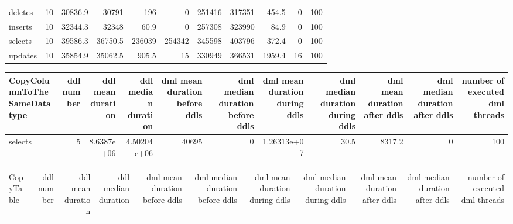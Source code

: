 \begin{tabular}{lrrrrrrrrrr}
\hline
 deletes         &           10 &             30836.9 &               30791   &                           196   &                                 0 &                          251416 &                            317351 &                          454.5 &                                0 &                              100 \\
 inserts         &           10 &             32344.3 &               32348   &                            60.9 &                                 0 &                          257308 &                            323990 &                           84.9 &                                0 &                              100 \\
 selects         &           10 &             39586.3 &               36750.5 &                        236039   &                            254342 &                          345598 &                            403796 &                          372.4 &                                0 &                              100 \\
 updates         &           10 &             35854.9 &               35062.5 &                           905.5 &                                15 &                          330949 &                            366531 &                         1959.4 &                               16 &                              100 \\
\hline
\end{tabular}\begin{tabular}{lrrrrrrrrrr}
\hline
 CopyColumnToTheSameDatatype   &   ddl number &   ddl mean duration &   ddl median duration &   dml mean duration before ddls &   dml median duration before ddls &   dml mean duration during ddls &   dml median duration during ddls &   dml mean duration after ddls &   dml median duration after ddls &   number of executed dml threads \\
\hline
 selects                       &            5 &          8.6387e+06 &           4.50204e+06 &                           40695 &                                 0 &                     1.26313e+07 &                              30.5 &                         8317.2 &                                0 &                              100 \\
\hline
\end{tabular}\begin{tabular}{lrrrrrrrrrr}
\hline
 CopyTable   &   ddl number &   ddl mean duration &   ddl median duration &   dml mean duration before ddls &   dml median duration before ddls &   dml mean duration during ddls &   dml median duration during ddls &   dml mean duration after ddls &   dml median duration after ddls &   number of executed dml threads \\

\end{tabular}

